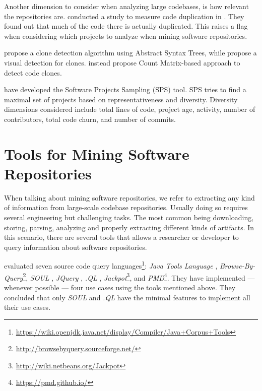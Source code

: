 
Another dimension to consider when analyzing large codebases, is how relevant the repositories are.
\cite{lopesDeJaVuMapCode2017} conducted a study to measure code duplication in \github{}.
They found out that much of the code there is actually duplicated.
This raises a flag when considering which projects to analyze when mining software repositories.

\cite{baxterCloneDetectionUsing1998} propose a clone detection algorithm using Abstract Syntax Trees,
while \cite{riegerVisualDetectionDuplicated} propose a visual detection for clones.
\cite{yuanCMCDCountMatrix2011,chenReplicationReproductionCode} instead propose Count Matrix-based approach to detect code clones.

\cite{nagappanDiversitySoftwareEngineering2013} have developed the Software Projects Sampling (SPS) tool.
SPS tries to find a maximal set of projects based on representativeness and diversity.
Diversity dimensions considered include total lines of code,
project age, activity, number of contributors, total code churn,
and number of commits.

\section{Tools for Mining Software Repositories}
\label{sec:lr:mining}

When talking about mining software repositories,
we refer to extracting any kind of information from large-scale codebase repositories. 
Usually doing so requires several engineering but challenging tasks.
The most common being downloading, storing, parsing, analyzing and properly extracting different kinds of artifacts.
In this scenario, there are several tools that allows a researcher or developer to query information about software repositories.

\cite{urmaProgrammingLanguageEvolution2012} evaluated seven source code
query languages\footnote{\url{https://wiki.openjdk.java.net/display/Compiler/Java+Corpus+Tools}}:
\emph{Java Tools Language} \citep{cohenJTLJavaTools},
\emph{Browse-By-Query}\footnote{\url{http://browsebyquery.sourceforge.net/}},
\emph{SOUL} \citep{derooverSOULToolSuite2011},
\emph{JQuery} \citep{volderJqueryGenericCode2006},
\emph{.QL} \citep{moorKeynoteAddressQL2007},
\emph{Jackpot}\footnote{\url{http://wiki.netbeans.org/Jackpot}}, and
\emph{PMD}\footnote{\url{https://pmd.github.io/}}.
They have implemented --- whenever possible --- four use cases using the tools mentioned above.
They concluded that only \emph{SOUL} and \emph{.QL} have the minimal features to implement all their use cases.


